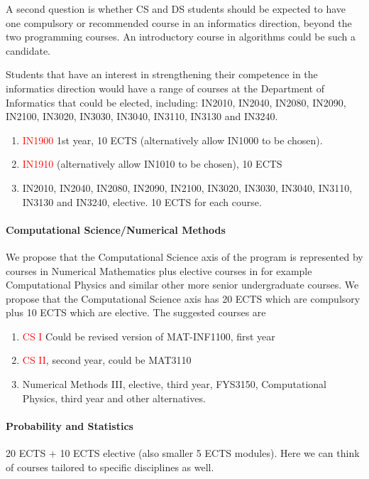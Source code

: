 \documentclass[oneside,final,10pt]{article}
\begin{document}
A second question is whether CS and DS students should be expected to have one compulsory or recommended course in an informatics direction, beyond the two programming courses. An introductory course in algorithms could be such a candidate. 

Students that have an interest in strengthening their competence in the informatics direction would have a range of courses at the Department of Informatics that could be elected, including: IN2010, IN2040, IN2080, IN2090, IN2100, IN3020, IN3030, IN3040, IN3110, IN3130 and IN3240.


\begin{enumerate}
    \item \textcolor{red}{IN1900} 1st year, 10 ECTS (alternatively allow IN1000 to be chosen).
    \item \textcolor{red}{IN1910} (alternatively allow IN1010 to be chosen), 10 ECTS
    \item IN2010, IN2040, IN2080, IN2090, IN2100, IN3020, IN3030, IN3040, IN3110, IN3130 and IN3240, elective. 10 ECTS for each course. 
\end{enumerate}


\paragraph{Computational Science/Numerical Methods}
We propose that the Computational Science axis of the program is represented by courses in Numerical Mathematics plus elective courses in for example Computational Physics and similar other more senior undergraduate courses. We propose that the Computational Science axis has 
20 ECTS which are compulsory plus  10 ECTS which are  elective. The suggested courses are
\begin{enumerate}
    \item \textcolor{red}{CS I} Could be revised version of MAT-INF1100, first year %
    \item \textcolor{red}{CS II}, second year, could be MAT3110
    \item Numerical Methods III, elective,  third year, FYS3150, Computational Physics, third year and other alternatives. 
\end{enumerate}

\paragraph{Probability and Statistics}
20 ECTS + 10 ECTS elective (also smaller 5 ECTS modules). Here we can think of courses tailored to specific disciplines as well. 
\end{document}
